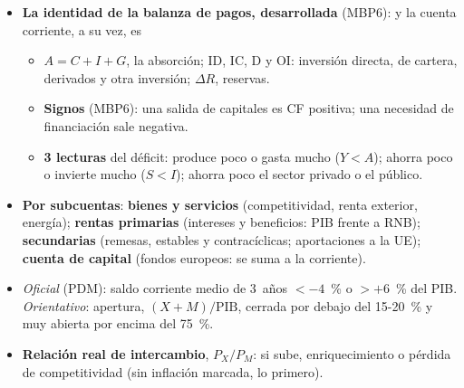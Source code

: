 \documentclass{article}
\begin{document}
\begin{columnas}
\begin{itemize}[itemsep=1.5pt]
\item \textbf{La identidad de la balanza de pagos, desarrollada} (MBP6):
y la cuenta corriente, a su vez, es
  \begin{itemize}
  \item $A=C+I+G$, la absorción; ID, IC, D y OI: inversión directa, de cartera, derivados y otra inversión; $\Delta R$, reservas.
  \item \textbf{Signos} (MBP6): una salida de capitales es CF positiva; una necesidad de financiación sale negativa.
  \item \textbf{3 lecturas} del déficit: produce poco o gasta mucho ($Y<A$); ahorra poco o invierte mucho ($S<I$); ahorra poco el sector privado o el público.
  \end{itemize}
\item \textbf{Por subcuentas}: \textbf{bienes y servicios} (competitividad, renta exterior, energía); \textbf{rentas primarias} (intereses y beneficios: PIB frente a RNB); \textbf{secundarias} (remesas, estables y contracíclicas; aportaciones a la UE); \textbf{cuenta de capital} (fondos europeos: se suma a la corriente).
\item \emph{Oficial} (PDM): saldo corriente medio de 3~años $<-4$~\% o $>+6$~\% del PIB. \emph{Orientativo}: apertura, $(X+M)/\mathrm{PIB}$, cerrada por debajo del 15-20~\% y muy abierta por encima del 75~\%.
\item \textbf{Relación real de intercambio}, $P_X/P_M$: si sube, enriquecimiento o pérdida de competitividad (sin inflación marcada, lo primero).

\end{itemize}
\end{columnas}
\end{document}
